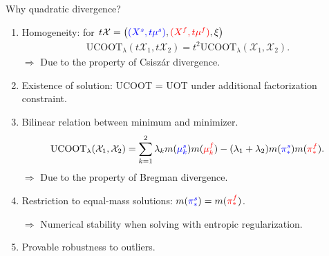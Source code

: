 \documentclass{beamer}
\newcommand{\ucoot}{\text{UCOOT}}
\newcommand{\cX}{\mathcal X}
\begin{document}
\begin{frame}{Why quadratic divergence?}
  \scriptsize
  \vspace{-1cm}
\begin{enumerate}
  \item Homogeneity:
  for $t\cX = \left({\color{blue}{(X^s, t\mu^s)}}, {\color{red}{(X^f, t\mu^f)}}, \xi \right)$
  \begin{align*}
    \ucoot_{\lambda}(t\cX_1, t\cX_2) = t^2 \ucoot_{\lambda}(\cX_1, \cX_2).
  \end{align*}
  $\Rightarrow$ Due to the property of Csiszár divergence.

  \item Existence of solution: UCOOT = UOT under additional
  factorization constraint.

  \item Bilinear relation between minimum and minimizer.
  \begin{align*}
    \ucoot_{\lambda}(\cX_1, \cX_2) =
    \sum_{k=1}^2 \lambda_k m({\color{blue}{\mu_k^s}}) m({\color{red}{\mu_k^f}})
    - (\lambda_1 + \lambda_2) m({\color{blue}{\pi^s_*}}) m({\color{red}{\pi^f_*}}).
  \end{align*}
  $\Rightarrow$ Due to the property of Bregman divergence.

  \item Restriction to equal-mass solutions: $m({\color{blue}{\pi^s_*}}) = m({\color{red}{\pi^f_*}})$.

  $\Rightarrow$ Numerical stability when solving with entropic regularization.

  \item Provable robustness to outliers.
\end{enumerate}


\end{frame}
\end{document}
